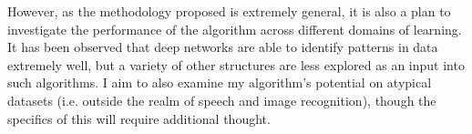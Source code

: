 \documentclass[11pt]{article}
\begin{document}
  However, as the methodology proposed is extremely general, it is also a plan to investigate the performance of the algorithm across different domains of learning.
  It has been observed that deep networks are able to identify patterns in data extremely well, but a variety of other structures are less explored as an input into such algorithms.
  I aim to also examine my algorithm's potential on atypical datasets (i.e. outside the realm of speech and image recognition), though the specifics of this will require additional thought.
\nocite{*}


\end{document}
